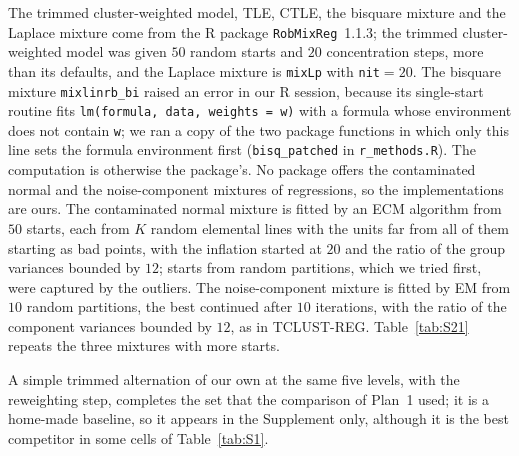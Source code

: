The trimmed cluster-weighted model, TLE, CTLE, the bisquare mixture and the Laplace mixture come
from the R package \texttt{RobMixReg}~1.1.3; the trimmed cluster-weighted model was given $50$
random starts and $20$ concentration steps, more than its defaults, and the Laplace mixture is
\texttt{mixLp} with \texttt{nit}$=20$. The bisquare mixture \texttt{mixlinrb\_bi} raised an error
in our R session, because its single-start routine fits \texttt{lm(formula, data, weights = w)}
with a formula whose environment does not contain \texttt{w}; we ran a copy of the two package
functions in which only this line sets the formula environment first (\texttt{bisq\_patched} in
\texttt{r\_methods.R}). The computation is otherwise the package's. No package offers the contaminated normal and the
noise-component mixtures of regressions, so the implementations are ours. The contaminated
normal mixture is fitted by an ECM algorithm from $50$ starts, each from $K$ random elemental
lines with the units far from all of them starting as bad points, with the inflation started at
$20$ and the ratio of the group variances bounded by $12$; starts from random partitions, which
we tried first, were captured by the outliers. The noise-component mixture is fitted by EM from
$10$ random partitions, the best continued after $10$ iterations, with the ratio of the component
variances bounded by $12$, as in TCLUST-REG. Table~\ref{tab:S21} repeats the three mixtures with
more starts.

A simple trimmed alternation of our own at the same five levels, with the reweighting step,
completes the set that the comparison of Plan~1 used; it is a home-made
baseline, so it appears in the Supplement only, although it is the best competitor in some
cells of Table~\ref{tab:S1}.
